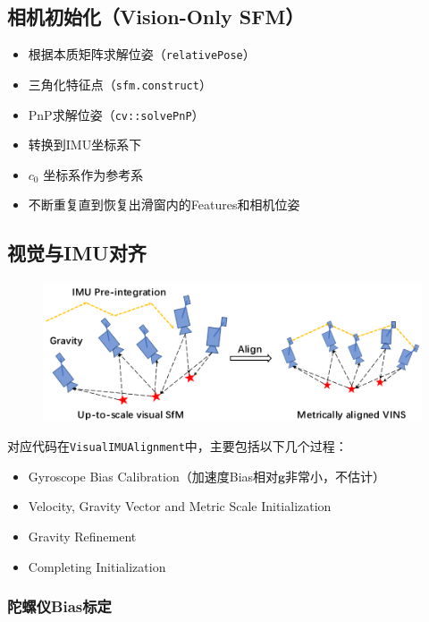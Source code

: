 \documentclass[12pt,a4paper]{article}
\begin{document}
\subsection{相机初始化（Vision-Only SFM）}

\begin{itemize}
\item 根据本质矩阵求解位姿（\verb|relativePose|）
\item 三角化特征点（\verb|sfm.construct|）
\item PnP求解位姿（\verb|cv::solvePnP|）
\item 转换到IMU坐标系下
\item $c_0$ 坐标系作为参考系
\item 不断重复直到恢复出滑窗内的Features和相机位姿
\end{itemize}

\subsection{视觉与IMU对齐}

\begin{figure}[htbp]
  \centering
  \includegraphics[scale=0.6]{images/visual_inertial_alignment.png}
\end{figure}

对应代码在\verb|VisualIMUAlignment|中，主要包括以下几个过程：
\begin{itemize}
\item Gyroscope Bias Calibration（加速度Bias相对$\mathbf{g}$非常小，不估计）
\item Velocity, Gravity Vector and Metric Scale Initialization
\item Gravity Refinement
\item Completing Initialization
\end{itemize}

\subsubsection{陀螺仪Bias标定}
\end{document}
